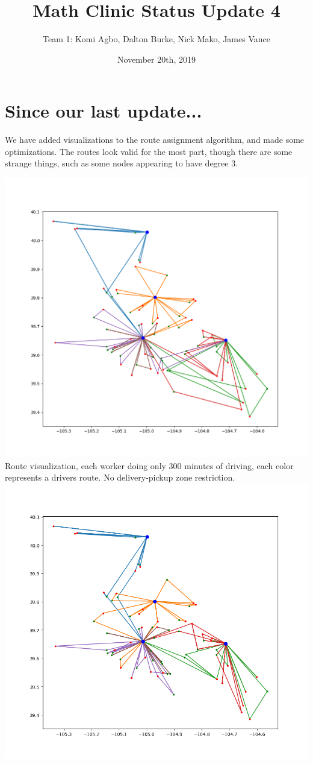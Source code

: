 \documentclass{article}
\title{Math Clinic Status Update 4}
\author{Team 1: Komi Agbo, Dalton Burke, Nick Mako, James Vance}
\date{November 20th, 2019}
\begin{document}
\maketitle

\section{Since our last update...}
We have added visualizations to the route assignment algorithm, and made some
optimizations. The routes look valid for the most part, though there are some
strange things, such as some nodes appearing to have degree 3.

\begin{center}
	\includegraphics[scale=.55]{img/unrestricted_300.png}\\
	Route visualization, each worker doing only 300 minutes of driving, 
	each color represents a drivers route. No delivery-pickup zone
	restriction.\\
	\includegraphics[scale=.55]{img/restricted_300.png}\\

\end{center}
\end{document}
